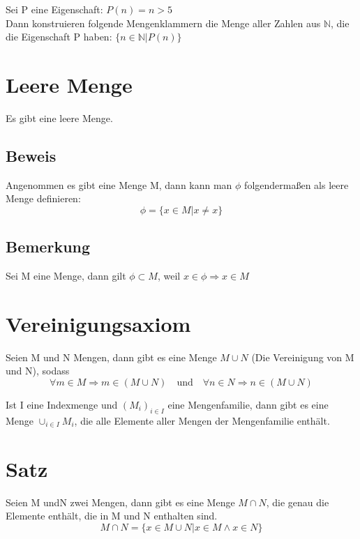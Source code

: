 \documentclass{article}
\begin{document}
Sei P eine Eigenschaft: $P(n) = n > 5$\\
Dann konstruieren folgende Mengenklammern die Menge aller Zahlen aus $\mathbb{N}$, die die Eigenschaft P
haben: $\{ n \in \mathbb{N} | P(n) \}$

\section{Leere Menge}

Es gibt eine leere Menge.

\subsection{Beweis}

Angenommen es gibt eine Menge M, dann kann man $\phi$ folgendermaßen als leere Menge definieren:
\begin{equation}
 \phi = \{ x \in M | x \ne x \}
\end{equation}

\subsection{Bemerkung}

Sei M eine Menge, dann gilt $\phi \subset M$, weil $x \in \phi \Longrightarrow x \in M$

\section{Vereinigungsaxiom}

Seien M und N Mengen, dann gibt es eine Menge $M \cup N$ (Die Vereinigung von M und N), sodass
\begin{equation}
 \forall m \in M \Longrightarrow m \in (M \cup N)
 \quad \text{und} \quad
 \forall n \in N \Longrightarrow n \in (M \cup N)
\end{equation}

Ist I eine Indexmenge und $(M_i)_{i \in I}$ eine Mengenfamilie, dann gibt es eine Menge $\cup_{i \in I} M_i$,
die alle Elemente aller Mengen der Mengenfamilie enthält.

\section{Satz}

Seien M undN zwei Mengen, dann gibt es eine Menge $M \cap N$, die genau die Elemente enthält, die in M und N enthalten sind.
\begin{equation}
 M \cap N = \{ x \in M \cup N | x \in M \land x \in N \}
\end{equation}
\end{document}
